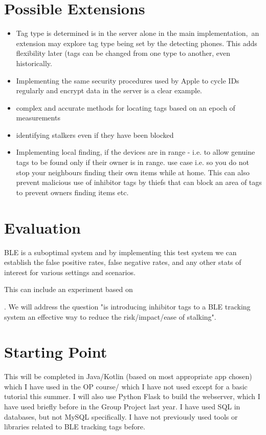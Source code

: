 \documentclass[12pt]{article}
\begin{document}
\section{Possible Extensions}
\begin{itemize}
\item{Tag type is determined is in the server alone in the main implementation, an extension may explore tag type being set by the detecting phones. This adds flexibility later (tags can be changed from one type to another, even historically.}
\item{Implementing the same security procedures used by Apple to cycle IDs regularly and encrypt data in the server is a clear example.
}
\item{complex and accurate methods for locating tags based on an epoch of measurements}
\item{identifying stalkers even if they have been blocked}
\item{Implementing local finding, if the devices are in range - i.e. to allow genuine tags to be found only if their owner is in range. use case i.e. so you do not stop your neighbours finding their own items while at home. This can also prevent malicious use of inhibitor tags by thiefs that can block an area of tags to prevent owners finding items etc.}
\end{itemize}
\section{Evaluation}
 BLE is a suboptimal system and by implementing this test system we can establish the false positive rates, false negative rates, and any other stats of interest for various settings and scenarios.

This can include an experiment based on 

. We will address the question "is introducing inhibitor tags to a BLE tracking system an effective way to reduce the risk/impact/ease of stalking".


\section{Starting Point}

This will be completed in  Java/Kotlin (based on most appropriate app chosen) which I have used in the OP course/  which I have not used except for a basic tutorial this summer.
 I will also use Python Flask to build the webserver, which I have used briefly before in the Group Project last year. I have used SQL in databases, but not MySQL specifically.  I have not previously used tools or libraries related to BLE tracking tags before.
\end{document}

